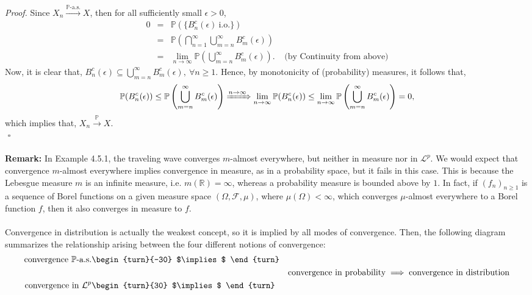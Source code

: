 \documentclass{article}
\begin{document}
\textit{Proof.} Since $X_n \xrightarrow{\mathbb{P}\text{-a.s.}} X$, then for all sufficiently small $\epsilon > 0$, 
\begin{eqnarray}
\nonumber
0 &=& \mathbb{P}(\{B_n^c(\epsilon) \ \text{i.o.}\})\\
\nonumber
&=& \mathbb{P}\left(\bigcap_{n=1}^{\infty}\bigcup_{m=n}^{\infty}B_m^c(\epsilon)\right)\\
\nonumber
&=& \lim_{n\to\infty}\mathbb{P}\left(\bigcup_{m=n}^{\infty}B_m^c(\epsilon)\right). \ \ \ \ \ \text{(by Continuity from above)}
\end{eqnarray}
Now, it is clear that, $B_n^c(\epsilon) \subseteq \bigcup_{m=n}^{\infty}B_m^c(\epsilon), \ \forall n \geq 1$. Hence, by monotonicity of (probability) measures, it follows that,
\begin{eqnarray}
\nonumber
\mathbb{P}(B_n^c(\epsilon)) \leq \mathbb{P}\left(\bigcup_{m=n}^{\infty}B_m^c(\epsilon)\right) \xRightarrow{n\to\infty} \lim_{n\to\infty}\mathbb{P}(B_n^c(\epsilon)) \leq \lim_{n\to\infty}\mathbb{P}\left(\bigcup_{m=n}^{\infty}B_m^c(\epsilon)\right) = 0,
\end{eqnarray}
which implies that, $X_n \xrightarrow{\mathbb{P}} X$. \\
${}$ \hfill $\square$ \\\\
\textbf{Remark:} In Example 4.5.1, the traveling wave converges $m$-almost everywhere, but neither in measure nor in $\mathcal{L}^p$. We would expect that convergence $m$-almost everywhere implies convergence in measure, as in a probability space, but it fails in this case. This is because the Lebesgue measure $m$ is an infinite measure, i.e. $m(\mathbb{R}) = \infty$, whereas a probability measure is bounded above by $1$. In fact, if $(f_n)_{n\geq1}$ is a sequence of Borel functions on a given measure space $(\Omega,\mathcal{F},\mu)$, where $\mu(\Omega) < \infty$, which converges $\mu$-almost everywhere to a Borel function $f$, then it also converges in measure to $f$. \\\\
Convergence in distribution is actually the weakest concept, so it is implied by all modes of convergence. Then, the following diagram summarizes the relationship arising between the four different notions of convergence:
\begin{eqnarray}
	\nonumber
	\text{convergence} \ \mathbb{P}\text{-a.s.} &\text{\begin{turn}{-30} $\implies$ \end{turn}}&\\
	\nonumber
	&{}& \text{convergence in probability} \implies \text{convergence in distribution}\\
	\nonumber
	\text{convergence in} \ \mathcal{L}^p &\text{\begin{turn}{30} $\implies$ \end{turn}}&
\end{eqnarray}
\end{document}
